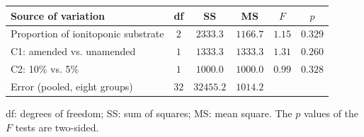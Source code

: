 \begin{tabular}{lccccc}
\hline\hline
\textbf{Source of variation} & \textbf{df} & \textbf{SS} & \textbf{MS} & \textbf{$F$} & \textbf{$p$} \\
\hline
Proportion of ionitoponic substrate & $2$ & $2333.3$ & $1166.7$ & $1.15$ & $0.329$ \\
\quad C1: amended vs. unamended & $1$ & $1333.3$ & $1333.3$ & $1.31$ & $0.260$ \\
\quad C2: 10\% vs. 5\% & $1$ & $1000.0$ & $1000.0$ & $0.99$ & $0.328$ \\
Error (pooled, eight groups) & $32$ & $32455.2$ & $1014.2$ &  &  \\
\hline
\end{tabular}
\par\vspace{4pt}
\parbox{0.94\linewidth}{\footnotesize df: degrees of freedom; SS: sum of squares; MS: mean square. The $p$ values of the $F$ tests are two-sided.}
